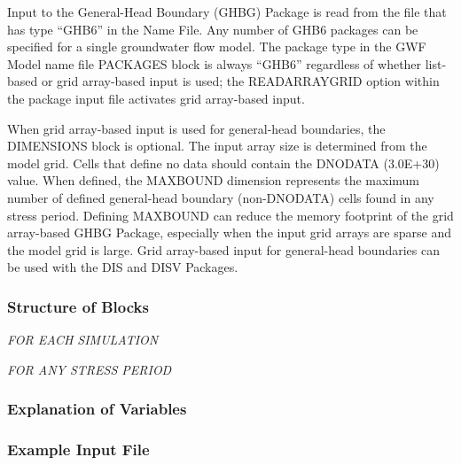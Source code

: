 Input to the General-Head Boundary (GHBG) Package is read from the file that has type ``GHB6'' in the Name File.  Any number of GHB6 packages can be specified for a single groundwater flow model.  The package type in the GWF Model name file PACKAGES block is always ``GHB6'' regardless of whether list-based or grid array-based input is used; the READARRAYGRID option within the package input file activates grid array-based input.

When grid array-based input is used for general-head boundaries, the DIMENSIONS block is optional.  The input array size is determined from the model grid.  Cells that define no data should contain the DNODATA (3.0E+30) value.  When defined, the MAXBOUND dimension represents the maximum number of defined general-head boundary (non-DNODATA) cells found in any stress period.  Defining MAXBOUND can reduce the memory footprint of the grid array-based GHBG Package, especially when the input grid arrays are sparse and the model grid is large.  Grid array-based input for general-head boundaries can be used with the DIS and DISV Packages.

\vspace{5mm}
\subsubsection{Structure of Blocks}
\vspace{5mm}

\noindent \textit{FOR EACH SIMULATION}


\vspace{5mm}
\noindent \textit{FOR ANY STRESS PERIOD}


\vspace{5mm}
\subsubsection{Explanation of Variables}
\begin{description}

\end{description}

\vspace{5mm}
\subsubsection{Example Input File}


